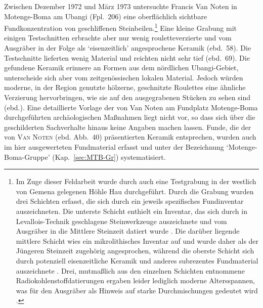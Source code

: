 \begin{multicols}{2}
Zwischen Dezember 1972 und März 1973 untersuchte Francis Van Noten in Motenge-Boma am \mbox{Ubangi} (Fpl.~206) eine oberflächlich sichtbare Fundkonzentration von geschliffenen Steinbeilen.\footnote{Im Zuge dieser Feldarbeit wurde durch \textcite[75]{vanNoten.1978} auch eine Testgrabung in der westlich von Gemena gelegenen Höhle Hau durchgeführt. Durch die Grabung wurden drei Schichten erfasst, die sich durch ein jeweils spezifisches Fundinventar auszeichneten. Die unterste Schicht enthielt ein Inventar, das sich durch in Levallois-Technik geschlagene Steinwerkzeuge auszeichnete und vom Ausgräber in die Mittlere Steinzeit datiert wurde \parencite[27, 30]{vanNoten.1982a}. Die darüber liegende mittlere Schicht wies ein mikrolithisches Inventar auf und wurde daher als der Jüngeren Steinzeit zugehörig angesprochen, während die oberste Schicht sich durch potenziell eisenzeitliche Keramik und anderes subrezentes Fundmaterial auszeichnete \parencite[31]{Bahuchet.1992}. Drei, mutmaßlich aus den einzelnen Schichten entnommene Radiokohlenstoffdatierungen ergaben leider lediglich moderne Altersspannen, was für den Ausgräber als Hinweis auf starke Durchmischungen gedeutet wird \parencite[27, 30]{vanNoten.1982a}.} Eine kleine Grabung mit einigen Testschnitten erbrachte aber nur wenig rouletteverzierte und vom Ausgräber in der Folge als \enquote*{eisenzeitlich} angesprochene Keramik (ebd.~58). Die Testschnitte lieferten wenig Material und reichten nicht sehr tief (ebd.~69). Die gefundene Keramik erinnere an Formen aus dem nördlichen Ubangi-Gebiet, unterscheide sich aber vom zeitgenössischen lokalen Material. Jedoch würden moderne, in der Region genutzte hölzerne, geschnitzte Roulettes eine ähnliche Verzierung hervorbringen, wie sie auf den ausgegrabenen Stücken zu sehen sind (ebd.). Eine detaillierte Vorlage der von Van Noten am Fundplatz Motenge-Boma durchgeführten archäologischen Maßnahmen liegt nicht vor, so dass sich über die geschilderten Sachverhalte hinaus keine Angaben machen lassen. Funde, die der von \textsc{Van Noten} (ebd. Abb.~40) präsentierten Keramik entsprechen, wurden auch im hier ausgewerteten Fundmaterial erfasst und unter der Bezeichnung \enquote*{Motenge-Boma-Gruppe} (Kap.~\ref{sec:MTB-Gr}) systematisiert.


\end{multicols}
